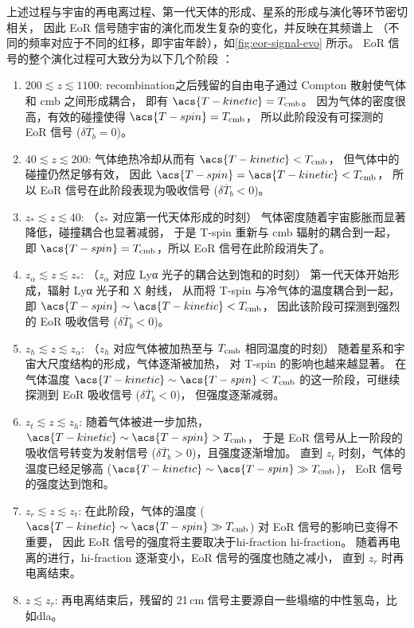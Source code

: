 上述过程与宇宙的再电离过程、第一代天体的形成、星系的形成与演化等环节密切相关，
因此 EoR 信号随宇宙的演化而发生复杂的变化，并反映在其频谱上
（不同的频率对应于不同的红移，即宇宙年龄），如\autoref{fig:eor-signal-evo} 所示。
EoR 信号的整个演化过程可大致分为以下几个阶段 \cite{pritchard2012}：
\begin{enumerate}
  \item $200 \lesssim z \lesssim 1100$:
    \ac{recombination}之后残留的自由电子通过 Compton 散射使气体
    和 \ac{cmb} 之间形成耦合，
    即有 $\acs{T-kinetic} = T_{\R{cmb}}$。
    因为气体的密度很高，有效的碰撞使得 $\acs{T-spin} = T_{\R{cmb}}$，
    所以此阶段没有可探测的 EoR 信号 ($\delta\overline{T}_b = 0$)。

  \item $40 \lesssim z \lesssim 200$:
    气体绝热冷却从而有 $\acs{T-kinetic} < T_{\R{cmb}}$，
    但气体中的碰撞仍然足够有效，
    因此 $\acs{T-spin} = \acs{T-kinetic} < T_{\R{cmb}}$，
    所以 EoR 信号在此阶段表现为吸收信号 ($\delta\overline{T}_b < 0$)。

  \item $z_* \lesssim z \lesssim 40$:
    （$z_*$ 对应第一代天体形成的时刻）
    气体密度随着宇宙膨胀而显著降低，碰撞耦合也显著减弱，
    于是 \acs{T-spin} 重新与 \ac{cmb} 辐射的耦合到一起，
    即 $\acs{T-spin} = T_{\R{cmb}}$，所以 EoR 信号在此阶段消失了。

  \item $z_{\alpha} \lesssim z \lesssim z_*$:
    （$z_{\alpha}$ 对应 Lyα 光子的耦合达到饱和的时刻）
    第一代天体开始形成，辐射 Lyα 光子和 X 射线，
    从而将 \acs{T-spin} 与冷气体的温度耦合到一起，
    即 $\acs{T-spin} \sim \acs{T-kinetic} < T_{\R{cmb}}$，
    因此该阶段可探测到强烈的 EoR 吸收信号 ($\delta\overline{T}_b < 0$)。

  \item $z_h \lesssim z \lesssim z_{\alpha}$:
    （$z_h$ 对应气体被加热至与 $T_{\mathrm{cmb}}$ 相同温度的时刻）
    随着星系和宇宙大尺度结构的形成，气体逐渐被加热，
    对 \acs{T-spin} 的影响也越来越显著。
    在气体温度 $\acs{T-kinetic} \sim \acs{T-spin} < T_{\R{cmb}}$
    的这一阶段，可继续探测到 EoR 吸收信号 ($\delta\overline{T}_b < 0$)，
    但强度逐渐减弱。

  \item $z_t \lesssim z \lesssim z_h$:
    随着气体被进一步加热，$\acs{T-kinetic} \sim \acs{T-spin} > T_{\R{cmb}}$，
    于是 EoR 信号从上一阶段的吸收信号转变为发射信号 
    ($\delta\overline{T}_b > 0$)，且强度逐渐增加。
    直到 $z_t$ 时刻，气体的温度已经足够高
    ($\acs{T-kinetic} \sim \acs{T-spin} \gg T_{\R{cmb}}$)，
    EoR 信号的强度达到饱和。

  \item $z_r \lesssim z \lesssim z_t$:
    在此阶段，气体的温度 ($\acs{T-kinetic} \sim \acs{T-spin} \gg T_{\R{cmb}}$)
    对 EoR 信号的影响已变得不重要，
    因此 EoR 信号的强度将主要取决于\acl{hi-fraction} \acs{hi-fraction}。
    随着再电离的进行，\acs{hi-fraction} 逐渐变小，EoR 信号的强度也随之减小，
    直到 $z_r$ 时再电离结束。

  \item $z \lesssim z_r$:
    再电离结束后，残留的 21\,cm 信号主要源自一些塌缩的中性氢岛，比如\ac{dla}。
\end{enumerate}

